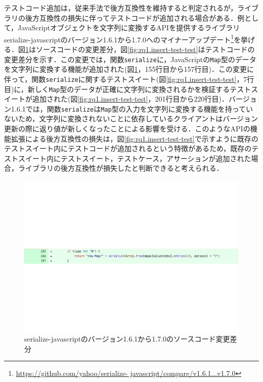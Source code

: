 \documentclass[11pt,dvipdfmx]{jreport}
\begin{document}
テストコード追加は，従来手法で後方互換性を維持すると判定されるが，ライブラリの後方互換性の損失に伴ってテストコードが追加される場合がある．例として，JavaScriptオブジェクトを文字列に変換するAPIを提供するライブラリserialize-javascriptのバージョン1.6.1から1.7.0へのマイナーアップデート\footnote{\url{https://github.com/yahoo/serialize- javascript/compare/v1.6.1...v1.7.0}}を挙げる．図\ref{fig:rq1.insert-test-src}はソースコードの変更差分，図\ref{fig:rq1.insert-test-test}はテストコードの変更差分を示す．この変更では，関数{\verb|serialize|}に，JavaScriptの{\verb|Map|}型のデータを文字列に変換する機能が追加された(図\ref{fig:rq1.insert-test-src}，155行目から157行目)．この変更に伴って，関数{\verb|serialize|}に関するテストスイート(図\ref{fig:rq1.insert-test-test}，7行目)に，新しく{\verb|Map|}型のデータが正確に文字列に変換されるかを検証するテストスイートが追加された(図\ref{fig:rq1.insert-test-test}，201行目から220行目)．バージョン1.6.1では，関数{\verb|serialize|}は{\verb|Map|}型の入力を文字列に変換する機能を持っていないため，文字列に変換されないことに依存しているクライアントはバージョン更新の際に返り値が新しくなったことによる影響を受ける．このようなAPIの機能拡張による後方互換性の損失は，図\ref{fig:rq1.insert-test-test}で示すように既存のテストスイート内にテストコードが追加されるという特徴があるため，既存のテストスイート内にテストスイート，テストケース，アサーションが追加された場合，ライブラリの後方互換性が損失したと判断できると考えられる．

\begin{figure}[t]
  \centering
  \includegraphics[width=1.0\linewidth]{fig/rq1/set-map/map.pdf}
  \caption{serialize-javascriptのバージョン1.6.1から1.7.0のソースコード変更差分}
  \label{fig:rq1.insert-test-src}
\end{figure}
\end{document}
